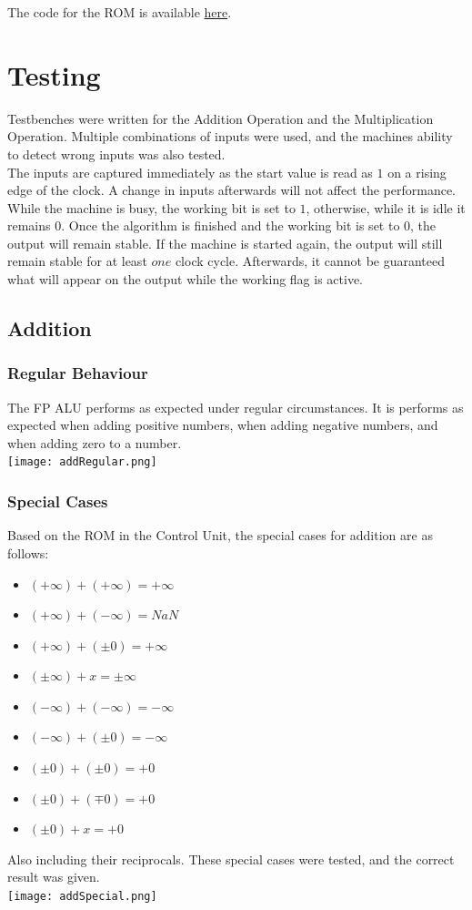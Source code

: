 \documentclass[a4paper,10pt]{article}
\begin{document}
    The code for the ROM is available \hyperref[sec:ROM]{here}.


    \section{Testing}
    Testbenches were written for the Addition Operation and the Multiplication Operation. Multiple combinations of inputs were used, and the machines ability to detect wrong inputs was also tested.\\
    The inputs are captured immediately as the start value is read as $1$ on a rising edge of the clock. A change in inputs afterwards will not affect the performance.\\
    While the machine is busy, the working bit is set to $1$, otherwise, while it is idle it remains $0$. Once the algorithm is finished and the working bit is set to $0$, the output will remain stable. If the machine is started again, the output will still remain stable for at least $one$ clock cycle. Afterwards, it cannot be guaranteed what will appear on the output while the working flag is active.

    \subsection{Addition}
    \subsubsection{Regular Behaviour}
    The FP ALU performs as expected under regular circumstances. It is performs as expected when adding positive numbers, when adding negative numbers, and when adding zero to a number.\\
    \texttt{[image: addRegular.png]}

    \newpage
    \subsubsection{Special Cases}
    Based on the ROM in the Control Unit, the special cases for addition are as follows:
    \begin{itemize}
     \item $(+\infty) + (+\infty) = +\infty$
     \item $(+\infty) + (-\infty) = NaN$
     \item $(+\infty) + (\pm0) = +\infty$
     \item $(\pm \infty) + x = \pm \infty$
     \item $(-\infty) + (-\infty) = -\infty$
     \item $(-\infty) + (\pm0) = -\infty$
     \item $(\pm0) + (\pm0) = +0$
     \item $(\pm0) + (\mp0) = +0$
     \item $(\pm0) + x = +0$
    \end{itemize}
    Also including their reciprocals.
    These special cases were tested, and the correct result was given.\\
    \texttt{[image: addSpecial.png]}
\end{document}
